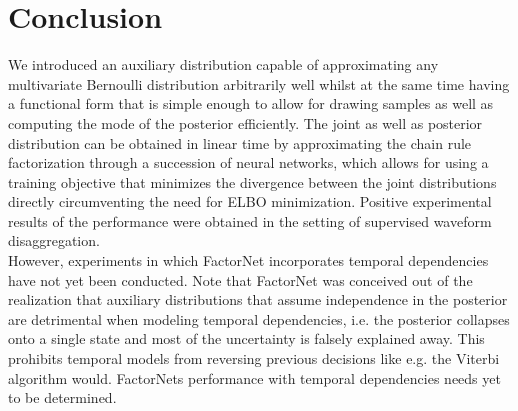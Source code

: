 \section{Conclusion}
We introduced an auxiliary distribution capable of approximating any multivariate Bernoulli distribution arbitrarily well whilst at the same time having a functional form that is simple enough to allow for drawing samples as well as computing the mode of the posterior efficiently. The joint as well as posterior distribution can be obtained in linear time by approximating the chain rule factorization through a succession of neural networks, which allows for using a training objective that minimizes the divergence between the joint distributions directly circumventing the need for ELBO minimization. Positive experimental results of the performance were obtained in the setting of supervised waveform disaggregation.\\
However, experiments in which FactorNet incorporates temporal dependencies have not yet been conducted. Note that FactorNet was conceived out of the realization that auxiliary distributions that assume independence in the posterior are detrimental when modeling temporal dependencies, i.e. the posterior collapses onto a single state and most of the uncertainty is falsely explained away. This prohibits temporal models from reversing previous decisions like e.g. the Viterbi~\cite{viterbi1967error} algorithm would. FactorNets performance with temporal dependencies needs yet to be determined.


